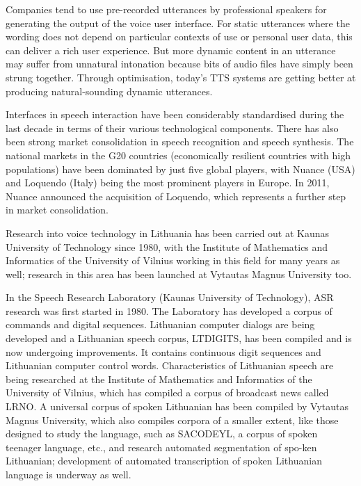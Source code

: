 \documentclass[]{../metanetpaper}
\begin{document}
\begin{multicols}{2}

Companies tend to use pre-recorded utterances by professional speakers for generating the output of the voice user interface. For static utterances where the wording does not depend on particular contexts of use or personal user data, this can deliver a rich user experience. But more dynamic content in an utterance may suffer from unnatural intonation because bits of audio files have simply been strung together. Through optimisation, today’s TTS systems are getting better at producing natural-sounding dynamic utterances.

Interfaces in speech interaction have been considerably standardised during the last decade in terms of their various technological components. There has also been strong market consolidation in speech recognition and speech synthesis. The national markets in the G20 countries (economically resilient countries with high populations) have been dominated by just five global players, with Nuance (USA) and Loquendo (Italy) being the most prominent players in Europe. In 2011, Nuance announced the acquisition of Loquendo, which represents a further step in market consolidation.

 Research into voice technology in Lithuania has been carried out at Kaunas University of Technology since 1980, with the Institute of Mathematics and Informatics of the University of Vilnius working in this field for many years as well; research in this area has been launched at Vytautas Magnus University too.

   In the Speech Research Laboratory (Kaunas University of Technology), ASR research was first started in 1980. The Laboratory has developed a corpus of commands and digital sequences. Lithuanian computer dialogs are being developed and a Lithuanian speech corpus, LTDIGITS, has been compiled and is now undergoing improvements. It contains continuous digit sequences and Lithuanian computer control words. Characteristics of Lithuanian speech are being researched at the Institute of Mathematics and Informatics of the University of Vilnius, which has compiled a corpus of broadcast news called LRNO. A universal corpus of spoken Lithuanian has been compiled by Vytautas Magnus University, which also compiles corpora of a smaller extent, like those designed to study the language, such as SACODEYL, a corpus of  spoken teenager language, etc., and research automated segmentation of spo-ken Lithuanian; development of automated transcription of spoken Lithuanian language is underway as well.


\end{multicols}
\end{document}
